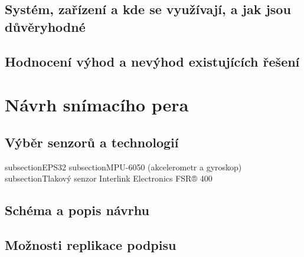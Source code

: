 \section{Systém, zařízení a kde se využívají, a jak jsou důvěryhodné}

\section{Hodnocení výhod a nevýhod existujících řešení}

\chapter{Návrh snímacího pera}
\section{Výběr senzorů a technologií}
\*subsection{EPS32}
\*subsection{MPU-6050 (akcelerometr a gyroskop)}
\*subsection{Tlakový senzor Interlink Electronics FSR® 400}
\section{Schéma a popis návrhu}
\section{Možnosti replikace podpisu}




